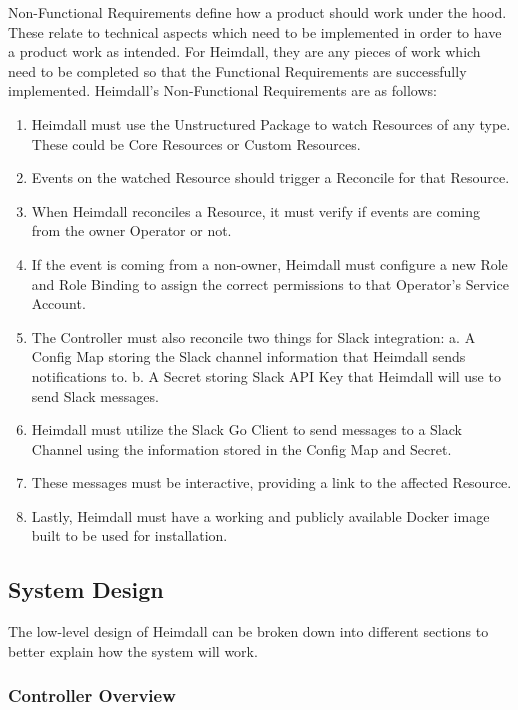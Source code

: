 \documentclass{article}
\begin{document}
Non-Functional Requirements define how a product should work under the hood. These relate to technical aspects which need to be implemented in order to have a product work as intended. For Heimdall, they are any pieces of work which need to be completed so that the Functional Requirements are successfully implemented. Heimdall's Non-Functional Requirements are as follows:
\begin{enumerate}
    \itemsep0em 
    \item Heimdall must use the Unstructured Package to watch Resources of any type. These could be Core Resources or Custom Resources.
    \item Events on the watched Resource should trigger a Reconcile for that Resource.
    \item When Heimdall reconciles a Resource, it must verify if events are coming from the owner Operator or not.
    \item If the event is coming from a non-owner, Heimdall must configure a new Role and Role Binding to assign the correct permissions to that Operator's Service Account.
    \item The Controller must also reconcile two things for Slack integration:
        \subitem a. A Config Map storing the Slack channel information that Heimdall sends notifications to.
        \subitem b. A Secret storing Slack API Key that Heimdall will use to send Slack messages.
    \item Heimdall must utilize the Slack Go Client to send messages to a Slack Channel using the information stored in the Config Map and Secret.
    \item These messages must be interactive, providing a link to the affected Resource. 
    \item Lastly, Heimdall must have a working and publicly available Docker image built to be used for installation.
\end{enumerate}

\subsection{System Design} \label{design-desc}

The low-level design of Heimdall can be broken down into different sections to better explain how the system will work.

\subsubsection{Controller Overview}
\end{document}
